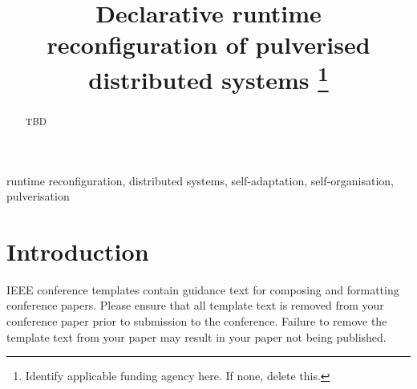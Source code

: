 \documentclass[conference]{IEEEtran}
\begin{document}
\title{Declarative runtime reconfiguration of pulverised distributed systems
\thanks{Identify applicable funding agency here. If none, delete this.}
}

\author{
\and
{}
\and
{}
\and
{}
}

\maketitle

\begin{abstract}
TBD
\end{abstract}

\begin{IEEEkeywords}
runtime reconfiguration, distributed systems, self-adaptation, self-organisation, pulverisation
\end{IEEEkeywords}

\section{Introduction}

\nocite{*}




\vspace{12pt}
\color{red}
IEEE conference templates contain guidance text for composing and formatting conference papers. Please ensure that all template text is removed from your conference paper prior to submission to the conference. Failure to remove the template text from your paper may result in your paper not being published.
\end{document}
